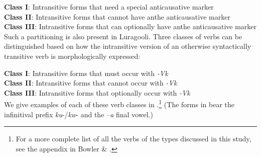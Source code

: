 \documentclass[output=paper]{langsci/langscibook}
\begin{document}
     \textbf{  }\textbf{Class I}: Intransitive forms that need a special anticausative marker\\
     \textbf{  }\textbf{Class II}: Intransitive forms that cannot have anthe anticausative marker\\
     \textbf{  }\textbf{Class III}: Intransitive forms that can optionally have anthe anticausative marker\\
Such a partitioning is also present in Luragooli. Three classes of verbs can be distinguished based on how the intransitive %
%
version of an otherwise syntactically transitive verb is morphologically expressed:

     \textbf{  }\textbf{Class I}: Intransitive forms that must occur with \textit{{}-}\textit{Vk}\\
     \textbf{  }\textbf{Class II}: Intransitive forms that cannot occur with \textit{{}-}\textit{Vk}\\
     \textbf{  }\textbf{Class III}: Intransitive forms that optionally occur with \textit{{}-}\textit{Vk}\\
We give examples of each of these verb classes in .\footnote{ For a more complete list of all the verbs of the types discussed in this study, see the appendix in Bowler \& \citet{Gluckman2015}.} (The forms in  bear the infinitival prefix \textit{ku}{}-/\textit{kw}{}- and the \textit{–a} final vowel.)%
%
\end{document}
